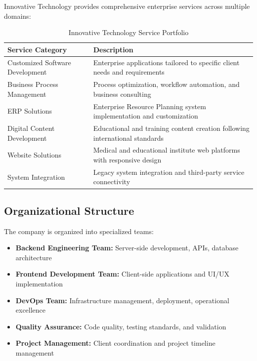 Innovative Technology provides comprehensive enterprise services across multiple domains:

\begin{table}[h]
    \centering
    \begin{tabularx}{\textwidth}{|l|X|}
        \hline
        \textbf{Service Category} & \textbf{Description} \\
        \hline
        Customized Software Development & Enterprise applications tailored to specific client needs and requirements \\
        \hline
        Business Process Management & Process optimization, workflow automation, and business consulting \\
        \hline
        ERP Solutions & Enterprise Resource Planning system implementation and customization \\
        \hline
        Digital Content Development & Educational and training content creation following international standards \\
        \hline
        Website Solutions & Medical and educational institute web platforms with responsive design \\
        \hline
        System Integration & Legacy system integration and third-party service connectivity \\
        \hline
    \end{tabularx}
    \caption{Innovative Technology Service Portfolio}
\end{table}

\subsection{Organizational Structure}

The company is organized into specialized teams:

\begin{itemize}
    \item \textbf{Backend Engineering Team:} Server-side development, APIs, database architecture
    \item \textbf{Frontend Development Team:} Client-side applications and UI/UX implementation
    \item \textbf{DevOps Team:} Infrastructure management, deployment, operational excellence
    \item \textbf{Quality Assurance:} Code quality, testing standards, and validation
    \item \textbf{Project Management:} Client coordination and project timeline management
\end{itemize}

